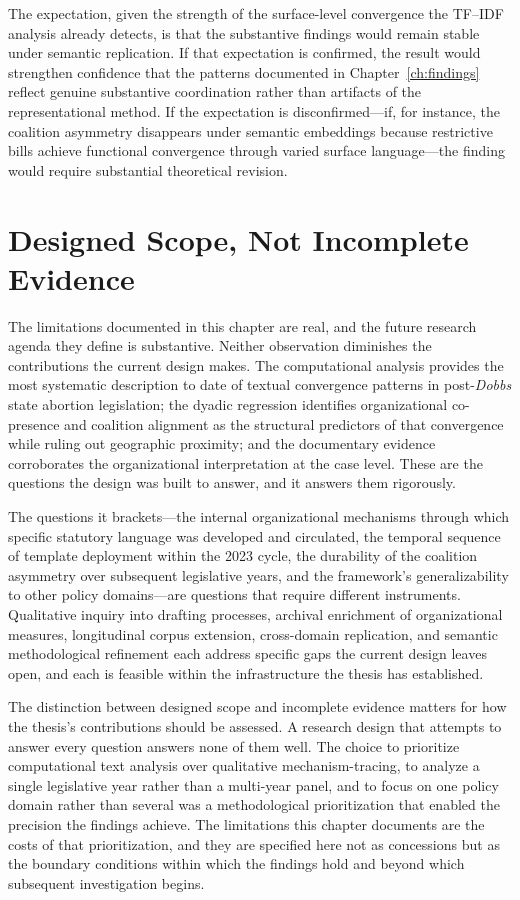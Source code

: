 The expectation, given the strength of the surface-level convergence the TF--IDF analysis already detects, is that the substantive findings would remain stable under semantic replication. If that expectation is confirmed, the result would strengthen confidence that the patterns documented in Chapter~\ref{ch:findings} reflect genuine substantive coordination rather than artifacts of the representational method. If the expectation is disconfirmed---if, for instance, the coalition asymmetry disappears under semantic embeddings because restrictive bills achieve functional convergence through varied surface language---the finding would require substantial theoretical revision.

\section{Designed Scope, Not Incomplete Evidence}
\label{sec:designed-scope}

The limitations documented in this chapter are real, and the future research agenda they define is substantive. Neither observation diminishes the contributions the current design makes. The computational analysis provides the most systematic description to date of textual convergence patterns in post-\emph{Dobbs} state abortion legislation; the dyadic regression identifies organizational co-presence and coalition alignment as the structural predictors of that convergence while ruling out geographic proximity; and the documentary evidence corroborates the organizational interpretation at the case level. These are the questions the design was built to answer, and it answers them rigorously.

The questions it brackets---the internal organizational mechanisms through which specific statutory language was developed and circulated, the temporal sequence of template deployment within the 2023 cycle, the durability of the coalition asymmetry over subsequent legislative years, and the framework's generalizability to other policy domains---are questions that require different instruments. Qualitative inquiry into drafting processes, archival enrichment of organizational measures, longitudinal corpus extension, cross-domain replication, and semantic methodological refinement each address specific gaps the current design leaves open, and each is feasible within the infrastructure the thesis has established.

The distinction between designed scope and incomplete evidence matters for how the thesis's contributions should be assessed. A research design that attempts to answer every question answers none of them well. The choice to prioritize computational text analysis over qualitative mechanism-tracing, to analyze a single legislative year rather than a multi-year panel, and to focus on one policy domain rather than several was a methodological prioritization that enabled the precision the findings achieve. The limitations this chapter documents are the costs of that prioritization, and they are specified here not as concessions but as the boundary conditions within which the findings hold and beyond which subsequent investigation begins.

